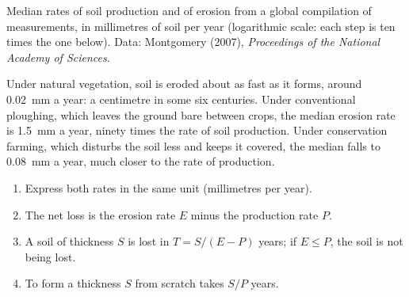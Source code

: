 \begin{omfigure}

{\small Median rates of soil production and of erosion from a global
compilation of measurements, in millimetres of soil per year (logarithmic
scale: each step is ten times the one below). Data: Montgomery (2007),
\emph{Proceedings of the National Academy of Sciences}.}
\end{omfigure}

Under natural vegetation, soil is eroded about as fast as it forms, around
\qty{0.02}{mm} a year: a centimetre in some six centuries. Under conventional
ploughing, which leaves the ground bare between crops, the median erosion rate
is \qty{1.5}{mm} a year, ninety times the rate of soil production. Under
conservation farming, which disturbs the soil less and keeps it covered, the
median falls to \qty{0.08}{mm} a year, much closer to the rate of
production.

\begin{method}\label{met:g10:soil-formation:rates}
\begin{enumerate}
  \item Express both rates in the same unit (millimetres per year).
  \item The net loss is the erosion rate $E$ minus the production rate $P$.
  \item A soil of thickness $S$ is lost in $T = S/(E - P)$ years; if
        $E \le P$, the soil is not being lost.
  \item To form a thickness $S$ from scratch takes $S/P$ years.
\end{enumerate}
\end{method}

